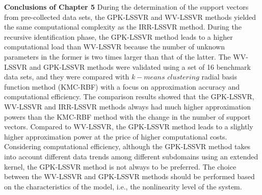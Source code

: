 \noindent \textbf{Conclusions of Chapter 5} During the determination of the support vectors from pre-collected data sets, the GPK-LSSVR and WV-LSSVR methods yielded the same computational complexity as the IRR-LSSVR method. During the recursive identification phase, the GPK-LSSVR method leads to a higher computational load than WV-LSSVR because the number of unknown parameters in the former is two times larger than that of the latter. The WV-LSSVR and GPK-LSSVR methods were validated using a set of 16 benchmark data sets, and they were compared with $k-means \, \, clustering$ radial basis function method (KMC-RBF) with a focus on approximation accuracy and computational efficiency. The comparison results showed that the GPK-LSSVR, WV-LSSVR and IRR-LSSVR methods always had much higher approximation powers than the KMC-RBF method with the change in the number of support vectors. Compared to WV-LSSVR, the GPK-LSSVR method leads to a slightly higher approximation power at the price of higher computational costs.
Considering computational efficiency, although the GPK-LSSVR method takes into account different data trends among different subdomains using an extended kernel, the GPK-LSSVR method is not always to be preferred. The choice between the WV-LSSVR and GPK-LSSVR methods should be performed based on the characteristics of the model, i.e., the nonlinearity level of the system.

\begin{shaded}
\end{shaded}
\vspace{-1.0cm}
\begin{shaded}
\end{shaded}


